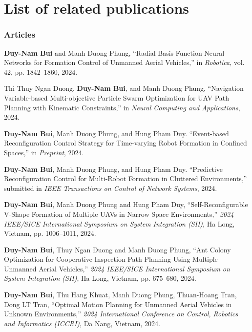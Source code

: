 \chapter*{List of related publications}

\subsection*{Articles}
\textbf{Duy-Nam Bui} and Manh Duong Phung, ``Radial Basis Function Neural Networks for Formation Control of Unmanned Aerial Vehicles,'' in \textit{Robotica}, vol. 42, pp. {1842--1860}, 2024.

Thi Thuy Ngan Duong, \textbf{Duy-Nam Bui}, and Manh Duong Phung, ``Navigation Variable-based Multi-objective Particle Swarm Optimization for UAV Path Planning with Kinematic Constraints,'' in \textit{Neural Computing and Applications}, 2024.

\textbf{Duy-Nam Bui}, Manh Duong Phung, and Hung Pham Duy. ``Event-based Reconfiguration Control Strategy for Time-varying Robot Formation in Confined Spaces,'' in \textit{Preprint}, 2024.

\textbf{Duy-Nam Bui}, Manh Duong Phung, and Hung Pham Duy. ``Predictive Reconfiguration Control for Multi-Robot Formation in Cluttered Environments,'' submitted in \textit{IEEE Transactions on Control of Network Systems}, 2024.

\textbf{Duy-Nam Bui}, Manh Duong Phung and Hung Pham Duy, ``Self-Reconfigurable V-Shape Formation of Multiple UAVs in Narrow Space Environments,'' \textit{2024 IEEE/SICE International Symposium on System Integration (SII)}, Ha Long, Vietnam, pp. 1006--1011, 2024.

\textbf{Duy-Nam Bui}, Thuy Ngan Duong and Manh Duong Phung, ``Ant Colony Optimization for Cooperative Inspection Path Planning Using Multiple Unmanned Aerial Vehicles,'' \textit{2024 IEEE/SICE International Symposium on System Integration (SII)}, Ha Long, Vietnam, pp. 675--680, 2024.

\textbf{Duy-Nam Bui}, Thu Hang Khuat, Manh Duong Phung, Thuan-Hoang Tran, Dong LT Tran, ``Optimal Motion Planning for Unmanned Aerial Vehicles in Unknown Environments,'' \textit{2024 International Conference on Control, Robotics and Informatics (ICCRI)}, Da Nang, Vietnam, 2024.


